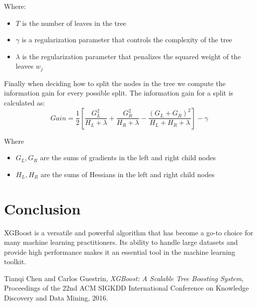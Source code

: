 \documentclass{article}
\begin{document}
\smallskip
\noindent
Where:
\begin{itemize}
    \item $T$ is the number of leaves in the tree
    \item $\gamma$ is a regularization parameter that controls 
    the complexity of the tree
    \item $\lambda$ is the regularization parameter that 
    penalizes the squared weight of the leaves $w_j$
\end{itemize}

\smallskip
\noindent
Finally when deciding how to split the nodes in the tree we 
compute the information gain for every possible split. 
The information gain for a split is calculated as:
$$Gain = \frac{1}{2} \left[ \frac{G_L^2}{H_L + \lambda} + 
\frac{G_R^2}{H_R + \lambda} - \frac{(G_L + G_R)^2}{H_L + H_R + 
\lambda} \right] - \gamma$$

\smallskip
\noindent
Where
\begin{itemize}
    \item $G_L, G_R$ are the sums of gradients in the left and 
    right child nodes
    \item $H_L, H_R$ are the sums of Hessians in the left and 
    right child nodes
\end{itemize}


\section{Conclusion}
XGBoost is a versatile and powerful algorithm that has become 
a go-to choice for many machine learning practitioners. Its 
ability to handle large datasets and provide high performance 
makes it an essential tool in the machine learning toolkit.

\begin{thebibliography}{9}
    Tianqi Chen and Carlos Guestrin,
    \textit{XGBoost: A Scalable Tree Boosting System},
    Proceedings of the 22nd ACM SIGKDD International Conference 
    on Knowledge Discovery and Data Mining, 2016.
\end{thebibliography}
\end{document}
